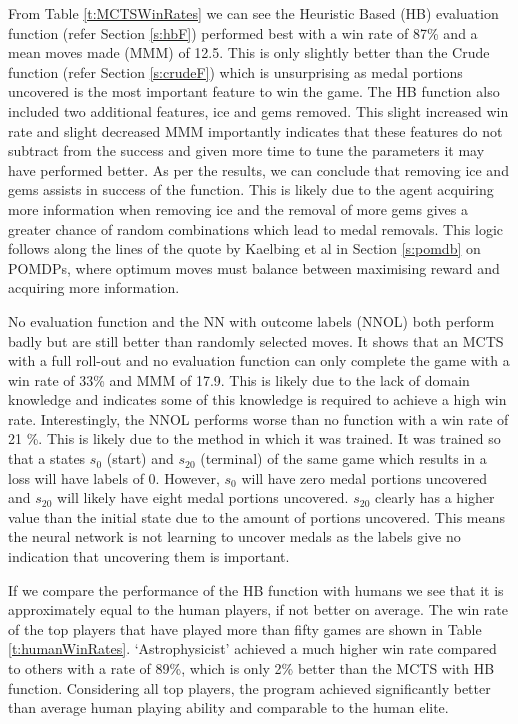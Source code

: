 \documentclass{bhamthesis}
\theoremstyle{definition}
\begin{document}
From Table \ref{t:MCTSWinRates} we can see the Heuristic Based (HB) evaluation function (refer Section \ref{s:hbF}) performed best with a win rate of 87\% and a mean moves made (MMM) of 12.5. This is only slightly better than the Crude function (refer Section \ref{s:crudeF}) which is unsurprising as medal portions uncovered is the most important feature to win the game. The HB function also included two additional features, ice and gems removed. This slight increased win rate and slight decreased MMM importantly indicates that these features do not subtract from the success and given more time to tune the parameters it may have performed better. As per the results, we can conclude that removing ice and gems assists in success of the function. This is likely due to the agent acquiring more information when removing ice and the removal of more gems gives a greater chance of random combinations which lead to medal removals. This logic follows along the lines of the quote by Kaelbing et al in Section \ref{s:pomdb} on POMDPs, where optimum moves must balance between maximising reward and acquiring more information.

No evaluation function and the NN with outcome labels (NNOL) both perform badly but are still better than randomly selected moves. It shows that an MCTS with a full roll-out and no evaluation function can only complete the game with a win rate of 33\% and MMM of 17.9. This is likely due to the lack of domain knowledge and indicates some of this knowledge is required to achieve a high win rate. Interestingly, the NNOL performs worse than no function with a win rate of 21 \%. This is likely due to the method in which it was trained. It was trained so that a states $s_0$ (start) and $s_{20}$ (terminal) of the same game which results in a loss will have labels of 0. However, $s_0$ will have zero medal portions uncovered and $s_{20}$ will likely have eight medal portions uncovered. $s_{20}$ clearly has a higher value than the initial state due to the amount of portions uncovered. This means the neural network is not learning to uncover medals as the labels give no indication that uncovering them is important.

If we compare the performance of the HB function with humans we see that it is approximately equal to the human players, if not better on average. The win rate of the top players that have played more than fifty games are shown in Table \ref{t:humanWinRates}. `Astrophysicist' achieved a much higher win rate compared to others with a rate of 89\%, which is only 2\% better than the MCTS with HB function. Considering all top players, the program achieved significantly better than average human playing ability and comparable to the human elite.
\end{document}
